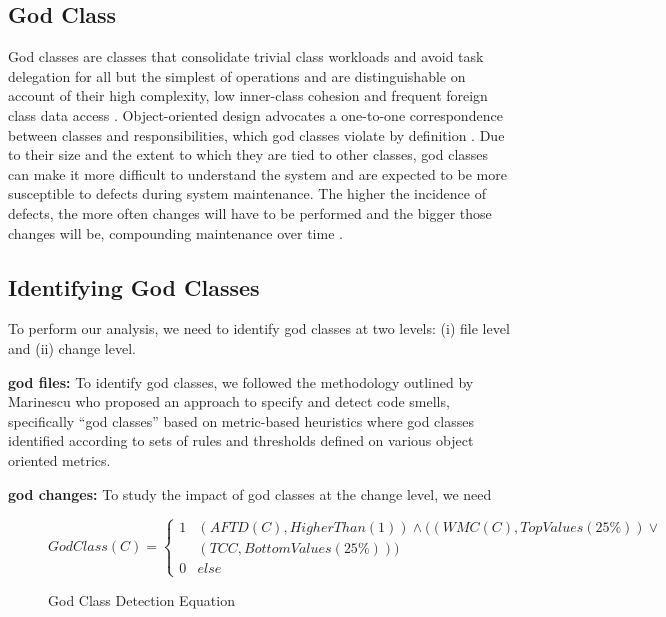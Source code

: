 \subsection{God Class}
God classes are classes that consolidate trivial class workloads and avoid task delegation for all but the simplest of operations and are distinguishable on account of their high complexity, low inner-class cohesion and frequent foreign class data access \cite{lanza2007object}. Object-oriented design advocates a one-to-one correspondence between classes and responsibilities, which god classes violate by definition \cite{lanza2007object}. Due to their size and the extent to which they are tied to other classes, god classes can make it more difficult to understand the system \cite{fowler1999refactoring} and are expected to be more susceptible to defects during system maintenance. The higher the incidence of defects, the more often changes will have to be performed and the bigger those changes will be, compounding maintenance over time \cite{fowler1999refactoring} \cite{lanza2007object}.

\subsection{Identifying God Classes}
\label{ch4_god}

To perform our analysis, we need to identify god classes at two levels: (i) file level and (ii) change level.

\textbf{god files:} To identify god classes, we followed the methodology outlined by Marinescu \cite{marinescu2004detection} who proposed an approach to specify and detect
code smells, specifically ``god classes'' based on metric-based heuristics where god classes identified according to sets of rules and thresholds defined on various object oriented metrics.

\noindent\textbf{god changes:}
To study the impact of god classes at the change level, we need 



\begin{figure}[h]
\[GodClass(C) = \left\{\begin{matrix}
1& (AFTD(C), HigherThan(1))  \wedge ((WMC(C), TopValues(25\%)) \vee \\ 
 & (TCC, BottomValues(25\%)))\\ 
0& else
\end{matrix}\right.\]
\caption{God Class Detection Equation}
\label{equation:1}
\end{figure}

